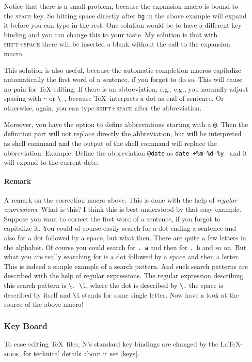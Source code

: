 \documentclass{article}
\newcommand{\latexpack}{\LaTeX-\textsc{mode}}
\newcommand{\nedit}{N\kern-0.8pt{Edit}}
\newcommand{\keyname}[1]{\textsc{#1}}
\begin{document}
Notice that there is a small problem, because the expansion macro is bound to the \keyname{space} key. So hitting space directly after \verb|bg| in the above example will expand it before you can type in the rest. One solution would be to have a different key binding and you can change this to your taste. My solution is that with \keyname{shift+space} there will be inserted a blank without the call to the expansion macro. 

This solution is also useful, because the automatic completion macros capitalize automatically the first word of a sentence, if you forgot to do so. This will cause no pain for \TeX-editing. If there is an abbreviation, e.g., e.g., you normally adjust spacing with \verb|~| or \verb*!\ !, because \TeX\ interprets a dot as end of sentence. Or otherwise, again, you can type \keyname{shift+space} after the abbreviation.

Moreover, you have the option to define abbreviations starting with a \verb|@|. Then the definition part will not replace directly the abbreviation, but will be interpreted as shell command and the output of the shell command will replace the abbreviation. Example: Define the abbreviation \verb"@date" as
\verb|date +%m-%d-%y | and it will expand to the current date.

\paragraph{Remark}\label{regex}
A remark on the correction macro above. This is done with the help of \emph{regular expressions}. What is this? I think this is best understood by that easy example. Suppose you want to correct the first word of a sentence, if you forgot to capitalize it. You could of course easily search for a dot ending a sentence and also for a dot followed by a space, but what then. There are quite a few letters in the alphabet. Of course you could search for \verb*|. a| and then for \verb*|. b| and so on. But what you are really searching for is a dot followed by a space and then a letter. This is indeed a simple example of a search pattern. And such search patterns are described with the help of regular expressions. The regular expression describing this search pattern is \verb*|\. \l|, where the dot is described by \verb|\.| the space is described by itself and \verb|\l| stands for some single letter. Now have a look at the source of the above macro!

\subsubsection{Key Board} 
To ease editing \TeX\ files, \nedit's standard key bindings are changed by the \latexpack, for technical details about it see \ref{keys}. 
\end{document}
